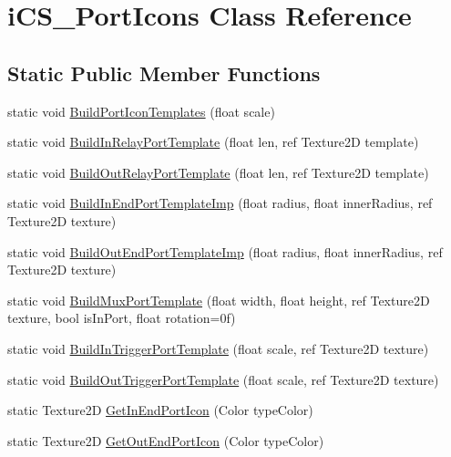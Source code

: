 \hypertarget{classi_c_s___port_icons}{\section{i\+C\+S\+\_\+\+Port\+Icons Class Reference}
\label{classi_c_s___port_icons}
}
\subsection*{Static Public Member Functions}
\begin{DoxyCompactItemize}
\item 
static void \hyperlink{classi_c_s___port_icons_afdccd30c90574e74ee60afd7c0ea8f7f}{Build\+Port\+Icon\+Templates} (float scale)
\item 
static void \hyperlink{classi_c_s___port_icons_a98c3ef041b737584b7e7e72755b9695f}{Build\+In\+Relay\+Port\+Template} (float len, ref Texture2\+D template)
\item 
static void \hyperlink{classi_c_s___port_icons_af59609947af4d1ac69a29466cce019fe}{Build\+Out\+Relay\+Port\+Template} (float len, ref Texture2\+D template)
\item 
static void \hyperlink{classi_c_s___port_icons_a5550e3478b435047253caec76b51c894}{Build\+In\+End\+Port\+Template\+Imp} (float radius, float inner\+Radius, ref Texture2\+D texture)
\item 
static void \hyperlink{classi_c_s___port_icons_af8f35d49b8642b4d38c82e61f5c1b17f}{Build\+Out\+End\+Port\+Template\+Imp} (float radius, float inner\+Radius, ref Texture2\+D texture)
\item 
static void \hyperlink{classi_c_s___port_icons_a2f470f884b5d437861fc282232c69a34}{Build\+Mux\+Port\+Template} (float width, float height, ref Texture2\+D texture, bool is\+In\+Port, float rotation=0f)
\item 
static void \hyperlink{classi_c_s___port_icons_ae9ded5a6e23abc7c00d5a32ab9d90b32}{Build\+In\+Trigger\+Port\+Template} (float scale, ref Texture2\+D texture)
\item 
static void \hyperlink{classi_c_s___port_icons_a153581c9dedb05d1fed71f96f1428ccc}{Build\+Out\+Trigger\+Port\+Template} (float scale, ref Texture2\+D texture)
\item 
static Texture2\+D \hyperlink{classi_c_s___port_icons_aed893d47c2e245c2e4b0d022a9a723f4}{Get\+In\+End\+Port\+Icon} (Color type\+Color)
\item 
static Texture2\+D \hyperlink{classi_c_s___port_icons_ac33185ce8ec0208c067c3c3cd61a5fd1}{Get\+Out\+End\+Port\+Icon} (Color type\+Color)

\end{DoxyCompactItemize}
